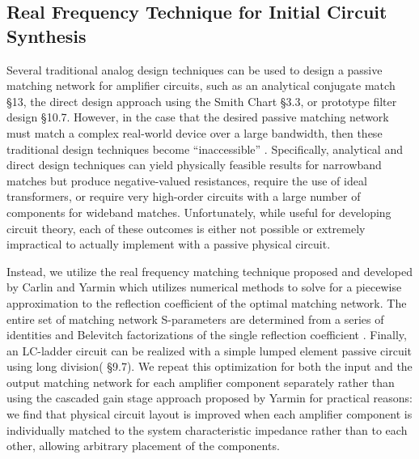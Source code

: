 \subsection{Real Frequency Technique for Initial Circuit Synthesis}
\label{sec_dual_match}

%

 	Several traditional analog design techniques can be used to design a passive matching network for amplifier circuits, such as an analytical conjugate match \cite{orfanidis2002electromagnetic} \S13, the direct design approach using the Smith Chart \cite{grebennikov2005rf} \S3.3, or prototype filter design \cite{grebennikov2005rf} \S10.7.	
	However, in the case that the desired passive matching network must match a complex real-world device over a large bandwidth, then these traditional design techniques become ``inaccessible'' \cite{yarman2010design, chen2015broadband}.
	Specifically, analytical and direct design techniques can yield physically feasible results for narrowband matches but produce negative-valued resistances, require the use of ideal transformers, or require very high-order circuits with a large number of components for wideband matches.
	Unfortunately, while useful for developing circuit theory, each of these outcomes is either not possible or extremely impractical to actually implement with a passive physical circuit.
	
	Instead, we utilize the real frequency matching technique proposed and developed by Carlin and Yarmin \cite{carlin1977new, carlin1983double, yarman1982simplified} which utilizes numerical methods to solve for a piecewise approximation to the reflection coefficient of the optimal matching network.
	The entire set of matching network S-parameters are determined from a series of identities and Belevitch factorizations of the single reflection coefficient \cite{yarman1982simplified}.
	Finally, an LC-ladder circuit can be realized with a simple lumped element passive circuit using long division(\cite{yarman2010design} \S9.7).
	We repeat this optimization for both the input and the output matching network for each amplifier component separately rather than using the cascaded gain stage approach proposed by Yarmin \cite{carlin1983double} for practical reasons: we find that physical circuit layout is improved when each amplifier component is individually matched to the system characteristic impedance rather than to each other, allowing arbitrary placement of the components.

